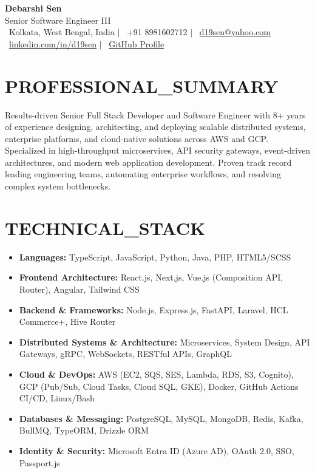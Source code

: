 \documentclass[10pt,letterpaper]{article}
\begin{document}
\begin{center}
    {\Huge \textbf{\color{obsidian}Debarshi Sen}} \\[1ex]
    {\Large \color{neonemerald}\ttfamily Senior Software Engineer III} \\[1.5ex]
    {\small \color{mutedslate}
    \faMapMarker\ Kolkata, West Bengal, India \quad $|$ \quad
    \faPhone\ +91 8981602712 \quad $|$ \quad
    \faEnvelope\ \href{mailto:d19sen@yahoo.com}{d19sen@yahoo.com} \\[0.5ex]
    \faLinkedin\ \href{https://linkedin.com/in/d19sen}{linkedin.com/in/d19sen} \quad $|$ \quad
    \faGithub\ \href{https://github.com/Ri96}{GitHub Profile}
    }
\end{center}

\vspace{1ex}

\section*{PROFESSIONAL\_SUMMARY}
Results-driven Senior Full Stack Developer and Software Engineer with 8+ years of experience designing, architecting, and deploying scalable distributed systems, enterprise platforms, and cloud-native solutions across AWS and GCP. Specialized in high-throughput microservices, API security gateways, event-driven architectures, and modern web application development. Proven track record leading engineering teams, automating enterprise workflows, and resolving complex system bottlenecks.

\section*{TECHNICAL\_STACK}
\begin{itemize}[label={\color{cyanhighlight}\ttfamily \$}]
    \item \textbf{Languages:} {\ttfamily TypeScript, JavaScript, Python, Java, PHP, HTML5/SCSS}
    \item \textbf{Frontend Architecture:} {\ttfamily React.js, Next.js, Vue.js (Composition API, Router), Angular, Tailwind CSS}
    \item \textbf{Backend \& Frameworks:} {\ttfamily Node.js, Express.js, FastAPI, Laravel, HCL Commerce+, Hive Router}
    \item \textbf{Distributed Systems \& Architecture:} {\ttfamily Microservices, System Design, API Gateways, gRPC, WebSockets, RESTful APIs, GraphQL}
    \item \textbf{Cloud \& DevOps:} {\ttfamily AWS (EC2, SQS, SES, Lambda, RDS, S3, Cognito), GCP (Pub/Sub, Cloud Tasks, Cloud SQL, GKE), Docker, GitHub Actions CI/CD, Linux/Bash}
    \item \textbf{Databases \& Messaging:} {\ttfamily PostgreSQL, MySQL, MongoDB, Redis, Kafka, BullMQ, TypeORM, Drizzle ORM}
    \item \textbf{Identity \& Security:} {\ttfamily Microsoft Entra ID (Azure AD), OAuth 2.0, SSO, Passport.js}
\end{itemize}
\end{document}
